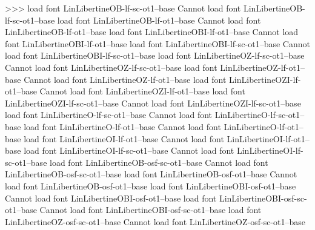 {{{>>>
load font	LinLibertineOB-lf-sc-ot1--base
Cannot load font LinLibertineOB-lf-sc-ot1--base
load font	LinLibertineOB-lf-ot1--base
Cannot load font LinLibertineOB-lf-ot1--base
load font	LinLibertineOBI-lf-ot1--base
Cannot load font LinLibertineOBI-lf-ot1--base
load font	LinLibertineOBI-lf-sc-ot1--base
Cannot load font LinLibertineOBI-lf-sc-ot1--base
load font	LinLibertineOZ-lf-sc-ot1--base
Cannot load font LinLibertineOZ-lf-sc-ot1--base
load font	LinLibertineOZ-lf-ot1--base
Cannot load font LinLibertineOZ-lf-ot1--base
load font	LinLibertineOZI-lf-ot1--base
Cannot load font LinLibertineOZI-lf-ot1--base
load font	LinLibertineOZI-lf-sc-ot1--base
Cannot load font LinLibertineOZI-lf-sc-ot1--base
load font	LinLibertineO-lf-sc-ot1--base
Cannot load font LinLibertineO-lf-sc-ot1--base
load font	LinLibertineO-lf-ot1--base
Cannot load font LinLibertineO-lf-ot1--base
load font	LinLibertineOI-lf-ot1--base
Cannot load font LinLibertineOI-lf-ot1--base
load font	LinLibertineOI-lf-sc-ot1--base
Cannot load font LinLibertineOI-lf-sc-ot1--base
load font	LinLibertineOB-osf-sc-ot1--base
Cannot load font LinLibertineOB-osf-sc-ot1--base
load font	LinLibertineOB-osf-ot1--base
Cannot load font LinLibertineOB-osf-ot1--base
load font	LinLibertineOBI-osf-ot1--base
Cannot load font LinLibertineOBI-osf-ot1--base
load font	LinLibertineOBI-osf-sc-ot1--base
Cannot load font LinLibertineOBI-osf-sc-ot1--base
load font	LinLibertineOZ-osf-sc-ot1--base
Cannot load font LinLibertineOZ-osf-sc-ot1--base
}}}
